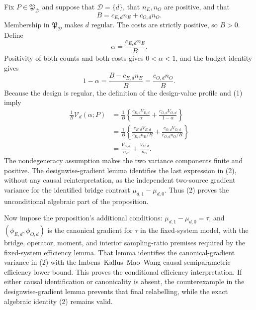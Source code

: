 Fix \(P\in\mathfrak P_{\mathcal D}\) and suppose that \(\mathcal D=\{d\}\), that \(n_E,n_O\) are positive, and that
\[
 B=c_{E,d}n_E+c_{O,d}n_O.
\]
Membership in \(\mathfrak P_{\mathcal D}\) makes \(d\) regular. The costs are strictly positive, so \(B>0\). Define
\[
 \alpha=\frac{c_{E,d}n_E}{B}.
\]
Positivity of both counts and both costs gives \(0<\alpha<1\), and the budget identity gives
\[
 1-\alpha
 =\frac{B-c_{E,d}n_E}{B}
 =\frac{c_{O,d}n_O}{B}. \tag{1}
\]
Because the design is regular, the definition of the design-value profile and (1) imply
\[
\begin{aligned}
 \frac{1}{B}\mathcal V_d(\alpha;P)
 &=\frac{1}{B}\left\{
   \frac{c_{E,d}V_{E,d}}{\alpha}
   +\frac{c_{O,d}V_{O,d}}{1-\alpha}
 \right\} \\
 &=\frac{1}{B}\left\{
   \frac{c_{E,d}V_{E,d}}{c_{E,d}n_E/B}
   +\frac{c_{O,d}V_{O,d}}{c_{O,d}n_O/B}
 \right\} \\
 &=\frac{V_{E,d}}{n_E}+\frac{V_{O,d}}{n_O}.
\end{aligned}\tag{2}
\]
The nondegeneracy assumption makes the two variance components finite and positive. The designwise-gradient lemma identifies the last expression in (2), without any causal reinterpretation, as the independent two-source gradient variance for the identified bridge contrast \(\mu_{d,1}-\mu_{d,0}\). Thus (2) proves the unconditional algebraic part of the proposition.

Now impose the proposition's additional conditions: \(\mu_{d,1}-\mu_{d,0}=\tau\), and \((\phi_{E,d},\phi_{O,d})\) is the canonical gradient for \(\tau\) in the fixed-system model, with the bridge, operator, moment, and interior sampling-ratio premises required by the fixed-system efficiency lemma. That lemma identifies the canonical-gradient variance in (2) with the Imbens--Kallus--Mao--Wang causal semiparametric efficiency lower bound. This proves the conditional efficiency interpretation. If either causal identification or canonicality is absent, the counterexample in the designwise-gradient lemma prevents that final relabelling, while the exact algebraic identity (2) remains valid.